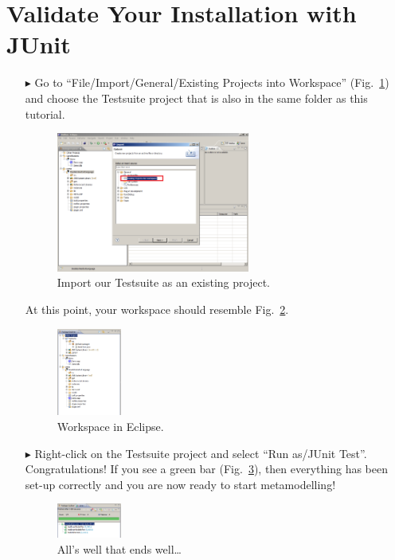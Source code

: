 \section{Validate Your Installation with JUnit}

\begin{enumerate}
\item[$\blacktriangleright$] Go to ``File/Import/General/Existing Projects
into Workspace'' (Fig.~\ref{fig_eclipseTestsuiteImport}) and choose the
Testsuite project that is also in the same folder as this tutorial. 
\begin{figure}[!h]
	\centering
  \includegraphics[width=0.6\textwidth]{pics/eclipse_testsuitimport.png}
	\caption{Import our Testsuite as an existing project.}
	\label{fig_eclipseTestsuiteImport}
\end{figure}

\newpage

\item[] At this point, your workspace should resemble
Fig.~\ref{fig_eclipsepackageexplorer}.
\begin{figure}[!h]
	\centering
  \includegraphics[width=0.2\textwidth]{pics/eclipse_packageexplorer.png}
	\caption{Workspace in Eclipse.}
	\label{fig_eclipsepackageexplorer}
\end{figure}

\item[$\blacktriangleright$] Right-click on the Testsuite project and select
``Run as/JUnit Test''.
Congratulations!  If you see a green bar  (Fig.~\ref{fig_eclipsetestsuiterun}),
then everything has been set-up correctly and you are now ready to start
metamodelling!
\begin{figure}[!h]
	\centering
  \includegraphics[width=0.2\textwidth]{pics/eclipse_testsuiterun.png}
	\caption{All's well that ends well\ldots}
	\label{fig_eclipsetestsuiterun}
\end{figure}
\end{enumerate}

